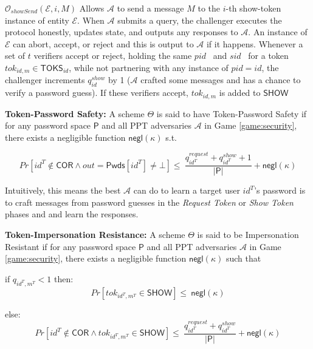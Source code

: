 \documentclass[conference]{IEEEtran}
\newcommand{\cA}{\mathcal{A}}
\newcommand{\cE}{\mathcal{E}}
\newcommand{\cO}{\mathcal{O}}
\newcommand{\secparameter}{\kappa}
\newcommand{\uid}{id}
\newcommand{\sP}{\mathsf{P}}
\newcommand{\pid}{$pid$}
\newcommand{\sid}{$sid$}
\begin{document}
\begin{multicols}{2}
\noindent \underline{$\cO_{showSend}(\cE, i, M)$} %
Allows $\cA$ to send a message $M$ to the $i$-th show-token instance of entity $\cE$. When $\cA$ submits a query, the challenger executes the protocol honestly, updates state, and outputs any responses to $\cA$. An instance of $\cE$ can abort, accept, or reject and this is output to $\cA$ if it happens. Whenever a set of $t$ verifiers accept or reject, holding the same \pid~ and \sid~ for a token $tok_{\uid,m} \in \mathsf{TOKS}_{\uid}$, while not partnering with any instance of \pid$= \uid$, the challenger increments $q^{show}_{\uid}$ by 1 ($\cA$ crafted some messages and has a chance to verify a password guess). If these verifiers accept, $tok_{\uid,m}$ is added to $\mathsf{SHOW}$     
\end{multicols}


\noindent
{\bf Token-Password Safety:} A scheme $\Theta$ is said to have Token-Password Safety if for any password space $\sP$ and all PPT adversaries $\cA$ in Game \ref{game:security}, there exists a negligible function $\mathsf{negl}(\secparameter)$ s.t.
   
   \[Pr[\uid^{T} \notin \mathsf{COR} \land out = \mathsf{Pwds}[\uid^T] \neq \bot] \leq ~ \frac{q^{request}_{\uid^T} + q^{show}_{\uid^T} + 1}{|\sP|} + \mathsf{negl}(\secparameter)\]

Intuitively, this means the best $\cA$ can do to learn a target user $\uid^{T}$'s password is to craft messages from password guesses in the {\em Request Token} or {\em Show Token} phases and and learn the responses.

\vspace{0.1cm}

\noindent
{\bf Token-Impersonation Resistance:} A scheme $\Theta$ is said to be Impersonation Resistant if for any password space $\mathsf{P}$ and all PPT adversaries $\cA$ in Game \ref{game:security}, there exists a negligible function $\mathsf{negl}(\secparameter)$ such that
   
   if $q_{\uid^{T},m^{T}} < 1$ then:
   \[Pr[tok_{\uid^{T},m^{T}} \in\mathsf{SHOW}] \leq ~ \mathsf{negl}(\secparameter)\]
   
   else:
   \[Pr[\uid^{T} \notin \mathsf{COR} \land tok_{\uid^{T},m^{T}} \in \mathsf{SHOW}] \leq ~ \frac{q^{request}_{\uid^{T}} + q^{show}_{\uid^{T}}}{|\sP|} + \mathsf{negl}(\secparameter)\]
\end{document}
